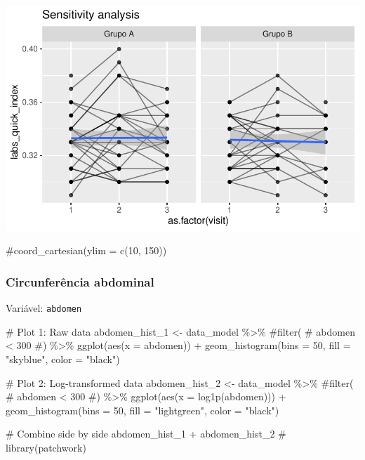 \documentclass[
  letterpaper,
  DIV=11,
  numbers=noendperiod]{scrartcl}
\newenvironment{Shaded}{\begin{snugshade}}{\end{snugshade}}
\newcommand{\AttributeTok}[1]{\textcolor[rgb]{0.40,0.45,0.13}{#1}}
\newcommand{\CommentTok}[1]{\textcolor[rgb]{0.37,0.37,0.37}{#1}}
\newcommand{\DecValTok}[1]{\textcolor[rgb]{0.68,0.00,0.00}{#1}}
\newcommand{\FunctionTok}[1]{\textcolor[rgb]{0.28,0.35,0.67}{#1}}
\newcommand{\NormalTok}[1]{\textcolor[rgb]{0.00,0.23,0.31}{#1}}
\newcommand{\OtherTok}[1]{\textcolor[rgb]{0.00,0.23,0.31}{#1}}
\newcommand{\SpecialCharTok}[1]{\textcolor[rgb]{0.37,0.37,0.37}{#1}}
\newcommand{\StringTok}[1]{\textcolor[rgb]{0.13,0.47,0.30}{#1}}
\begin{document}
\includegraphics{Outcomes_V1V2V3_files/figure-pdf/labs_quick_index_6-2.pdf}

\begin{Shaded}
\begin{Highlighting}[]
    \CommentTok{\#coord\_cartesian(ylim = c(10, 150))}
\end{Highlighting}
\end{Shaded}

\subsubsection{Circunferência
abdominal}\label{circunferuxeancia-abdominal}

Variável: \texttt{abdomen}

\begin{Shaded}
\begin{Highlighting}[]
\CommentTok{\# Plot 1: Raw data}
\NormalTok{abdomen\_hist\_1 }\OtherTok{\textless{}{-}}\NormalTok{ data\_model }\SpecialCharTok{\%\textgreater{}\%} 
    \CommentTok{\#filter(}
    \CommentTok{\#    abdomen \textless{} 300}
    \CommentTok{\#) \%\textgreater{}\% }
    \FunctionTok{ggplot}\NormalTok{(}\FunctionTok{aes}\NormalTok{(}\AttributeTok{x =}\NormalTok{ abdomen)) }\SpecialCharTok{+} 
    \FunctionTok{geom\_histogram}\NormalTok{(}\AttributeTok{bins =} \DecValTok{50}\NormalTok{, }\AttributeTok{fill =} \StringTok{"skyblue"}\NormalTok{, }\AttributeTok{color =} \StringTok{"black"}\NormalTok{)}

\CommentTok{\# Plot 2: Log{-}transformed data}
\NormalTok{abdomen\_hist\_2 }\OtherTok{\textless{}{-}}\NormalTok{ data\_model }\SpecialCharTok{\%\textgreater{}\%} 
    \CommentTok{\#filter(}
    \CommentTok{\#    abdomen \textless{} 300}
    \CommentTok{\#) \%\textgreater{}\%}
    \FunctionTok{ggplot}\NormalTok{(}\FunctionTok{aes}\NormalTok{(}\AttributeTok{x =} \FunctionTok{log1p}\NormalTok{(abdomen))) }\SpecialCharTok{+} 
    \FunctionTok{geom\_histogram}\NormalTok{(}\AttributeTok{bins =} \DecValTok{50}\NormalTok{, }\AttributeTok{fill =} \StringTok{"lightgreen"}\NormalTok{, }\AttributeTok{color =} \StringTok{"black"}\NormalTok{)}

\CommentTok{\# Combine side by side}
\NormalTok{abdomen\_hist\_1 }\SpecialCharTok{+}\NormalTok{ abdomen\_hist\_2 }\CommentTok{\# library(patchwork)}
\end{Highlighting}
\end{Shaded}
\end{document}
